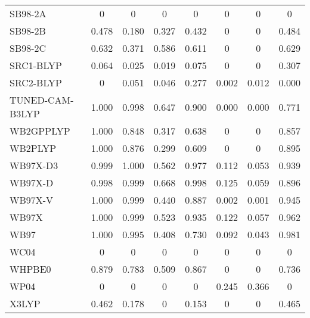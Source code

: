 \begin{table*}
\begin{tabular}{|l|c|c|c|c|c|c|c|}
SB98-2A~\cite{Schmider1998_9624} & 0 & 0 & 0 & 0 & 0 & 0 & 0 \\
SB98-2B~\cite{Schmider1998_9624} & 0.478 & 0.180 & 0.327 & 0.432 & 0 & 0 & 0.484 \\
SB98-2C~\cite{Schmider1998_9624} & 0.632 & 0.371 & 0.586 & 0.611 & 0 & 0 & 0.629 \\
SRC1-BLYP~\cite{Besley2009_10350} & 0.064 & 0.025 & 0.019 & 0.075 & 0 & 0 & 0.307 \\
SRC2-BLYP~\cite{Besley2009_10350} & 0 & 0.051 & 0.046 & 0.277 & 0.002 & 0.012 & 0.000 \\
TUNED-CAM-B3LYP~\cite{Okuno2012_29} & 1.000 & 0.998 & 0.647 & 0.900 & 0.000 & 0.000 & 0.771 \\
WB2GPPLYP~\cite{CasanovaPaez2019_4735} & 1.000 & 0.848 & 0.317 & 0.638 & 0 & 0 & 0.857 \\
WB2PLYP~\cite{CasanovaPaez2019_4735} & 1.000 & 0.876 & 0.299 & 0.609 & 0 & 0 & 0.895 \\
WB97X-D3~\cite{Lin2013_263} & 0.999 & 1.000 & 0.562 & 0.977 & 0.112 & 0.053 & 0.939 \\
WB97X-D~\cite{Chai2008_6615} & 0.998 & 0.999 & 0.668 & 0.998 & 0.125 & 0.059 & 0.896 \\
WB97X-V~\cite{Mardirossian2014_9904} & 1.000 & 0.999 & 0.440 & 0.887 & 0.002 & 0.001 & 0.945 \\
WB97X~\cite{Chai2008_084106} & 1.000 & 0.999 & 0.523 & 0.935 & 0.122 & 0.057 & 0.962 \\
WB97~\cite{Chai2008_084106} & 1.000 & 0.995 & 0.408 & 0.730 & 0.092 & 0.043 & 0.981 \\
WC04~\cite{Wiitala2006_1085} & 0 & 0 & 0 & 0 & 0 & 0 & 0 \\
WHPBE0~\cite{Shao2020_587} & 0.879 & 0.783 & 0.509 & 0.867 & 0 & 0 & 0.736 \\
WP04~\cite{Wiitala2006_1085} & 0 & 0 & 0 & 0 & 0.245 & 0.366 & 0 \\
X3LYP~\cite{Xu2004_2673} & 0.462 & 0.178 & 0 & 0.153 & 0 & 0 & 0.465 \\
\bottomrule
\end{tabular}
\end{table*}
